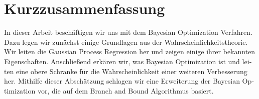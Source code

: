 \chapter*{Kurzzusammenfassung}
\begin{otherlanguage}{ngerman}
In dieser Arbeit beschäftigen wir uns mit dem Bayesian Optimization Verfahren. 
Dazu legen wir zunächst einige Grundlagen aus der Wahrscheinlichkeitstheorie. 
Wir leiten die Gaussian Process Regression her und zeigen einige ihrer bekannten Eigenschaften. 
Anschließend erkären wir, was Bayesian Optimization ist und leiten eine obere Schranke für die Wahrscheinlichkeit einer weiteren Verbesserung her. 
Mithilfe dieser Abschätzung schlagen wir eine Erweiterung der Bayesian Optimization vor, die auf dem Branch and Bound Algorithmus basiert. 
\end{otherlanguage}

